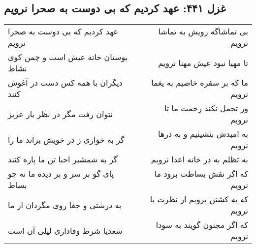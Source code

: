 \begin{center}
\section*{غزل ۴۴۱: عهد کردیم که بی دوست به صحرا نرویم}
\label{sec:441}
\begin{longtable}{l p{0.5cm} r}
عهد کردیم که بی دوست به صحرا نرویم
&&
بی تماشاگه رویش به تماشا نرویم
\\
بوستان خانه عیش است و چمن کوی نشاط
&&
تا مهیا نبود عیش مهنا نرویم
\\
دیگران با همه کس دست در آغوش کنند
&&
ما که بر سفره خاصیم به یغما نرویم
\\
نتوان رفت مگر در نظر یار عزیز
&&
ور تحمل نکند زحمت ما تا نرویم
\\
گر به خواری ز در خویش براند ما را
&&
به امیدش بنشینیم و به درها نرویم
\\
گر به شمشیر احبا تن ما پاره کنند
&&
به تظلم به در خانه اعدا نرویم
\\
پای گو بر سر و بر دیده ما نه چو بساط
&&
که اگر نقش بساطت برود ما نرویم
\\
به درشتی و جفا روی مگردان از ما
&&
که به کشتن برویم از نظرت یا نرویم
\\
سعدیا شرط وفاداری لیلی آن است
&&
که اگر مجنون گویند به سودا نرویم
\\
\end{longtable}
\end{center}
